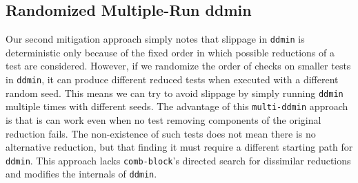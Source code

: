 \begin{algorithm}
\caption{}
\label{comb-block}
\begin{algorithmic}[1]
\EndIf
{}
\Else
{}
\EndIf
\EndIf
\EndFor
\EndFor
{}
\EndWhile
{}
\end{algorithmic}
\end{algorithm}

\subsection{Randomized Multiple-Run ddmin}

Our second mitigation approach simply notes that slippage in {\tt ddmin} is
deterministic only because of the fixed order in which possible
reductions of a test  are considered.  However, if we randomize
the order of checks on smaller tests in {\tt ddmin}, it can produce different
reduced tests when executed with a different random seed.  This means
we can try to avoid slippage by simply running {\tt ddmin} multiple
times with different seeds.  The advantage of this {\tt multi-ddmin}
approach is that is can work even when no test removing
components of the original reduction fails.  The non-existence of such
tests does not mean
there is no alternative reduction, but that finding it must
require a different starting path for {\tt ddmin}.
This approach lacks {\tt comb-block}'s directed search
for dissimilar reductions and modifies the internals of {\tt ddmin}.
